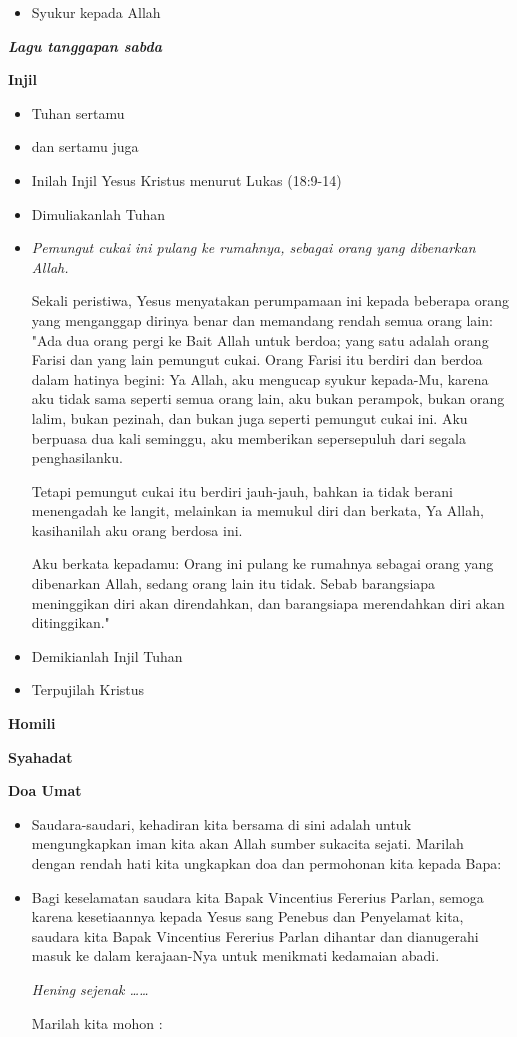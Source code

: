 \documentclass[titlepage,10pt,openany]{scrbook}
\makeatletter
\newcommand{\subjudul}[1]{%
  {\parindent \z@ 
    \interlinepenalty\@M \bfseries #1\par\nobreak \vskip 10\p@ }}
\newcommand{\lagu}[1]{%
  {\parindent \z@ 
    \interlinepenalty\@M \slshape \bfseries \normalsize \textit{#1}\par\nobreak \vskip 10\p@ }}
\newcommand{\BU}[1]{\begin{itemize} \item[U:] #1 \end{itemize}}
\newcommand{\BI}[1]{\begin{itemize} \item[I:] #1 \end{itemize}}
\newcommand{\BP}[1]{\begin{itemize} \item[P:] #1 \end{itemize}}
\newcommand{\namaalm}{Bapak Vincentius Fererius Parlan\xspace}
\makeatother
\begin{document}
\BU{Syukur kepada Allah}

\lagu{Lagu tanggapan sabda}
 

\subjudul{Injil}

\BI{Tuhan sertamu}

\BU{dan sertamu juga} 

\BI{Inilah Injil Yesus Kristus menurut Lukas (18:9-14)}

\BU{Dimuliakanlah Tuhan}

\BI{\textit{Pemungut cukai ini pulang ke rumahnya,  
sebagai orang yang dibenarkan Allah.}

Sekali peristiwa, 
Yesus menyatakan perumpamaan ini 
kepada beberapa orang yang menganggap dirinya benar  
dan memandang rendah semua orang lain: 
"Ada dua orang pergi ke Bait Allah untuk berdoa;  
yang satu adalah orang Farisi dan yang lain pemungut cukai. 
Orang Farisi itu berdiri dan berdoa dalam hatinya begini:  
Ya Allah, aku mengucap syukur kepada-Mu,  
karena aku tidak sama seperti semua orang lain,  
aku bukan perampok, bukan orang lalim, bukan pezinah, 
dan bukan juga seperti pemungut cukai ini. 
Aku berpuasa dua kali seminggu,  
aku memberikan sepersepuluh dari segala penghasilanku. 

Tetapi pemungut cukai itu berdiri jauh-jauh,  
bahkan ia tidak berani menengadah ke langit,  
melainkan ia memukul diri dan berkata,  
Ya Allah, kasihanilah aku orang berdosa ini. 

Aku berkata kepadamu:  
Orang ini pulang ke rumahnya  
sebagai orang yang dibenarkan Allah,  
sedang orang lain itu tidak.  
Sebab barangsiapa meninggikan diri akan direndahkan,  
dan barangsiapa merendahkan diri akan ditinggikan." }


\BI{Demikianlah Injil Tuhan}

\BU{Terpujilah Kristus}

 

\subjudul{Homili}

\subjudul{Syahadat} 

\subjudul{Doa Umat}
\BI{Saudara-saudari, kehadiran kita bersama di sini adalah untuk mengungkapkan iman kita akan Allah sumber sukacita sejati. Marilah dengan rendah hati kita ungkapkan doa dan permohonan kita kepada Bapa:}

\BP{Bagi keselamatan saudara kita \namaalm, semoga karena kesetiaannya kepada Yesus sang Penebus 
	dan Penyelamat kita, saudara kita  \namaalm{} dihantar dan 
	dianugerahi masuk ke dalam kerajaan-Nya untuk 
	menikmati kedamaian abadi.
	
\textit{Hening sejenak \ldots\ldots} 

Marilah kita mohon :}
\end{document}
